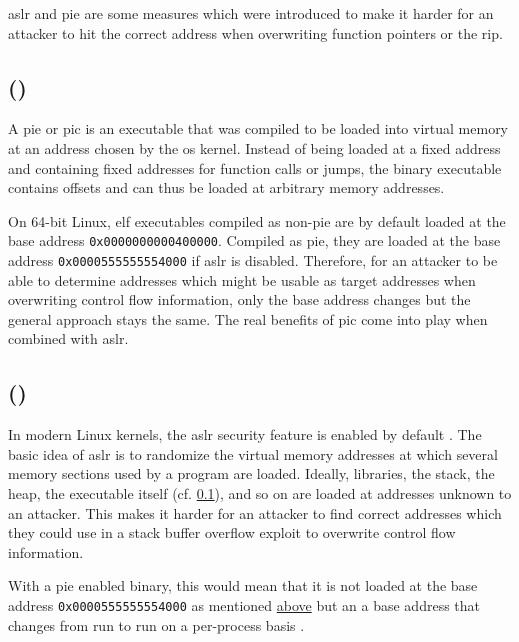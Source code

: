 \gls{aslr} and \acrfull{pie} are some measures which were introduced to make it harder for an attacker to hit the correct address when overwriting function pointers or the \gls{rip}.

\subsection{ ()}
\label{subsec:position-independent-executable}

A \gls{pie} or \gls{pic} is an executable that was compiled to be loaded into virtual memory at an address chosen by the \gls{os} kernel.
Instead of being loaded at a fixed address and containing fixed addresses for function calls or jumps, the binary executable contains offsets and can thus be loaded at arbitrary memory addresses.

On 64-bit Linux, \gls{elf} executables compiled as non-\acs{pie} are by default loaded at the base address \texttt{0x0000000000400000}.
Compiled as \gls{pie}, they are loaded at the base address \texttt{0x0000555555554000} if \gls{aslr} is disabled.
Therefore, for an attacker to be able to determine addresses which might be usable as target addresses when overwriting control flow information, only the base address changes but the general approach stays the same.
The real benefits of \gls{pic} come into play when combined with \gls{aslr}.

\subsection{ ()}
\label{subsec:address-space-layout-randomization}

In modern Linux kernels, the \gls{aslr} security feature is enabled by default \cite{Boelen2018}.
The basic idea of \gls{aslr} is to randomize the virtual memory addresses at which several memory sections used by a program are loaded.
Ideally, libraries, the stack, the heap, the executable itself (cf. \cref{subsec:position-independent-executable}), and so on are loaded at addresses unknown to an attacker.
This makes it harder for an attacker to find correct addresses which they could use in a stack buffer overflow exploit to overwrite control flow information.

With a \gls{pie} enabled binary, this would mean that it is not loaded at the base address \texttt{0x0000555555554000} as mentioned \hyperref[subsec:position-independent-executable]{above} but an a base address that changes from run to run on a per-process basis \cite{MarcoGisbert2014}.

